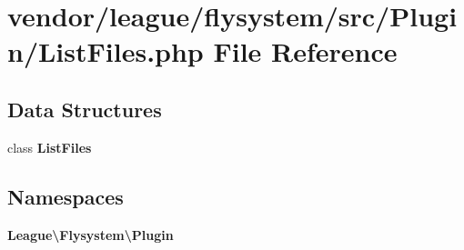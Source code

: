 \section{vendor/league/flysystem/src/\+Plugin/\+List\+Files.php File Reference}
\label{_list_files_8php}
\subsection*{Data Structures}
\begin{DoxyCompactItemize}
\item 
class {\bf List\+Files}
\end{DoxyCompactItemize}
\subsection*{Namespaces}
\begin{DoxyCompactItemize}
\item 
 {\bf League\textbackslash{}\+Flysystem\textbackslash{}\+Plugin}
\end{DoxyCompactItemize}
